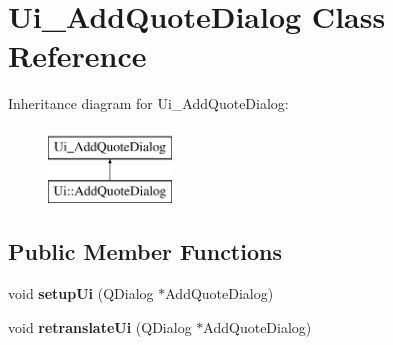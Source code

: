\hypertarget{classUi__AddQuoteDialog}{\section{Ui\-\_\-\-Add\-Quote\-Dialog Class Reference}
\label{classUi__AddQuoteDialog}
}
Inheritance diagram for Ui\-\_\-\-Add\-Quote\-Dialog\-:\begin{figure}[H]
\begin{center}
\leavevmode
\includegraphics[height=2.000000cm]{d0/d1e/classUi__AddQuoteDialog}
\end{center}
\end{figure}
\subsection*{Public Member Functions}
\begin{DoxyCompactItemize}
\item 
\hypertarget{classUi__AddQuoteDialog_a9505a7c9b917c138e74344766fa4b4cf}{void {\bfseries setup\-Ui} (Q\-Dialog $\ast$Add\-Quote\-Dialog)}\label{classUi__AddQuoteDialog_a9505a7c9b917c138e74344766fa4b4cf}

\item 
\hypertarget{classUi__AddQuoteDialog_ac27d8a53e6712f5f77faa54107a5a3c6}{void {\bfseries retranslate\-Ui} (Q\-Dialog $\ast$Add\-Quote\-Dialog)}\label{classUi__AddQuoteDialog_ac27d8a53e6712f5f77faa54107a5a3c6}

\end{DoxyCompactItemize}
